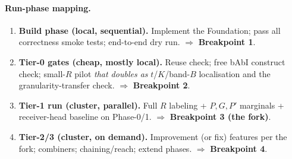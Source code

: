 \documentclass[11pt]{article}
\begin{document}
\paragraph{Run-phase mapping.}
\begin{enumerate}
\item \textbf{Build phase (local, sequential).} Implement the Foundation; pass all correctness smoke
tests; end-to-end dry run. $\Rightarrow$ \textbf{Breakpoint 1}.
\item \textbf{Tier-0 gates (cheap, mostly local).} Reuse check; free bAbI construct check; small-$R$
pilot \emph{that doubles as} $t$/$K$/band-$B$ localisation and the granularity-transfer check.
$\Rightarrow$ \textbf{Breakpoint 2}.
\item \textbf{Tier-1 run (cluster, parallel).} Full $R$ labeling + $P,G,P'$ marginals + receiver-head
baseline on Phase-0/1. $\Rightarrow$ \textbf{Breakpoint 3 (the fork)}.
\item \textbf{Tier-2/3 (cluster, on demand).} Improvement (or fix) features per the fork; combiners;
chaining/reach; extend phases. $\Rightarrow$ \textbf{Breakpoint 4}.
\end{enumerate}
\end{document}
